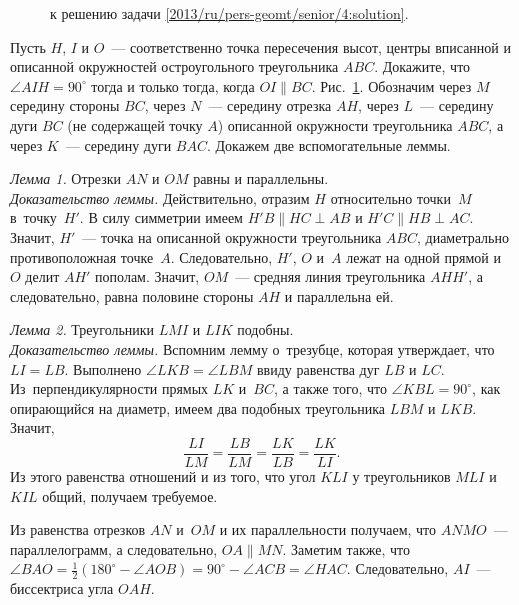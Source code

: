 \ifsolution
\begin{figure}[b!]\centering
    \caption{к решению задачи \ref{2013/ru/pers-geomt/senior/4:solution}.}
    \label{2013/ru/pers-geomt/senior/4:solution:fig}
\end{figure}%
\fi %

\problem
Пусть $H$, $I$ и $O$~--- соответственно точка пересечения высот, центры
вписанной и описанной окружностей остроугольного треугольника $ABC$.
Докажите, что $\angle AIH = 90^\circ$ тогда и только тогда, когда
$OI \parallel BC$.
\solution
\label{2013/ru/pers-geomt/senior/4:solution}%
Рис.~\ref{2013/ru/pers-geomt/senior/4:solution:fig}.
Обозначим через $M$ середину стороны $BC$, через $N$~--- середину отрезка $AH$,
через $L$~--- середину дуги $BC$ (не содержащей точку $A$) описанной окружности
треугольника $ABC$, а через $K$~--- середину дуги $BAC$.
Докажем две вспомогательные леммы.
\par
\emph{Лемма 1.} Отрезки $AN$ и $OM$ равны и параллельны.
\\\emph{Доказательство леммы.}
Действительно, отразим $H$ относительно точки~$M$ в~точку~$H'$.
В силу симметрии имеем $H' B \parallel HC \perp AB$
и $H' C \parallel HB \perp AC$.
Значит, $H'$~--- точка на описанной окружности треугольника $ABC$, диаметрально
противоположная точке~$A$.
Следовательно, $H'$, $O$ и~$A$ лежат на одной прямой и $O$ делит $AH'$ пополам.
Значит, $OM$~--- средняя линия треугольника $AHH'$, а следовательно, равна
половине стороны $AH$ и параллельна ей.
\par
\emph{Лемма 2.} Треугольники $LMI$ и $LIK$ подобны.
\\\emph{Доказательство леммы.}
Вспомним лемму о~трезубце, которая утверждает, что $LI = LB$.
Выполнено $\angle LKB = \angle LBM$ ввиду равенства дуг $LB$ и $LC$.
Из~перпендикулярности прямых $LK$ и~$BC$, а также того, что
$\angle KBL = 90^\circ$, как опирающийся на диаметр, имеем два подобных
треугольника $LBM$ и $LKB$.
Значит,
\[
    \frac{LI}{LM} = \frac{LB}{LM}
=
    \frac{LK}{LB} = \frac{LK}{LI}
.\]
Из этого равенства отношений и из того, что угол $KLI$ у треугольников $MLI$
и $KIL$ общий, получаем требуемое.
\par
Из равенства отрезков $AN$ и~$OM$ и их параллельности получаем, что $ANMO$~---
параллелограмм, а следовательно, $OA \parallel MN$.
Заметим также, что
\(
    \angle BAO
=
    \frac{1}{2}(180^\circ - \angle AOB)
=
    90^\circ - \angle ACB = \angle HAC
\).
Следовательно, $AI$~--- биссектриса угла $OAH$.
\par
